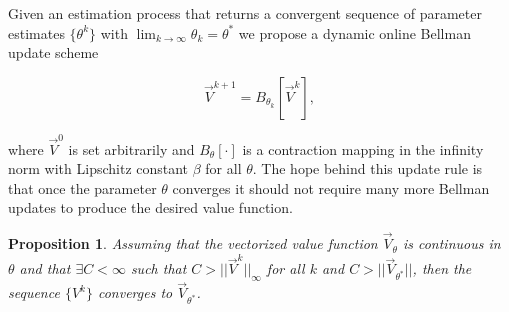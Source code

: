 \documentclass{journal}
\newtheorem{proposition}{Proposition}
\begin{document}
Given an estimation process that returns a convergent sequence of parameter estimates $\{\theta^k\}$  with $\lim_{k \rightarrow \infty} \theta_k = \theta^*$ we propose a dynamic online Bellman update scheme 

\begin{equation} \label{eq:dyn_bell}
\vec{V}^{k+1}=B_{\theta_k}[\vec{V}^k],
\end{equation}

\noindent where $\vec{V}^{0}$ is set arbitrarily and $B_\theta[\cdot]$ is a contraction mapping in the infinity norm with Lipschitz constant $\beta$ for all $\theta$. The hope behind this update rule is that  once the parameter $\theta$ converges it should not require many more Bellman updates to produce the desired value function. 

\begin{proposition} 
Assuming that the vectorized value function $\vec{V}_\theta$ is continuous in $\theta$ and that $\exists C<\infty$ such that $C>||\vec{V}^k||_{\infty}$ for all $k$ and $C>||\vec{V}_{\theta^*}||$, then the sequence $\{V^k\}$ converges to $\vec{V}_{\theta^*}$.
\end{proposition}
\end{document}

